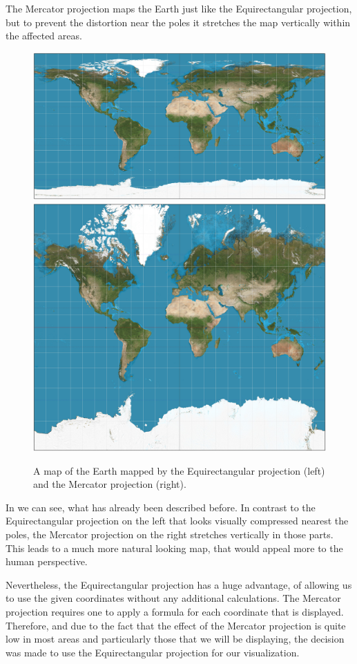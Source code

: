 \documentclass
[
    paper = a4,
    pagesize,
    12 pt,
    twoside,                       %
    open = right,
    DIV = calc,
    BCOR = 0 mm,                   %
    bibtotoc
]
{scrbook}
\begin{document}
The Mercator projection maps the Earth just like the Equirectangular projection, but to prevent the distortion near the poles it stretches the map vertically within the affected areas.

\begin{figure}
  \begin{minipage}{\textwidth}
    \includegraphics[width=.5\textwidth]{Images/Equirectangular_projection_SW.jpg}
    \includegraphics[width=.5\textwidth]{Images/Mercator_projection_SW.jpg}
    \caption[]{A map of the Earth mapped by the Equirectangular projection (left) and the Mercator projection (right). }
    \label{fig:projections}
  \end{minipage}
\end{figure}

In  we can see, what has already been described before.
In contrast to the Equirectangular projection on the left that looks visually compressed nearest the poles, the Mercator projection on the right stretches vertically in those parts.
This leads to a much more natural looking map, that would appeal more to the human perspective.

Nevertheless, the Equirectangular projection has a huge advantage, of allowing us to use the given coordinates without any additional calculations.
The Mercator projection requires one to apply a formula for each coordinate that is displayed.
Therefore, and due to the fact that the effect of the Mercator projection is quite low in most areas and particularly those that we will be displaying, the decision was made to use the Equirectangular projection for our visualization.
\end{document}
